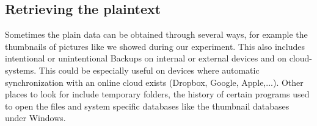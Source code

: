 \subsection{Retrieving the plaintext}
Sometimes the plain data can be obtained through several ways, for example the thumbnails of pictures like we showed during our experiment. 
This also includes intentional or unintentional Backups on internal or external devices and on cloud-systems.
This could be especially useful on devices where automatic synchronization with an online cloud exists (Dropbox, Google, Apple,...). 
Other places to look for include temporary folders, the history of certain programs used to open the files and system specific databases like the thumbnail databases under Windows.
